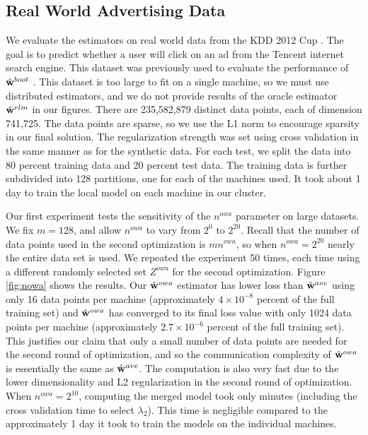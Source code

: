 \documentclass[thesis.tex]{subfiles}
\newcommand{\Zowa}{Z^{\textit{owa}}}
\newcommand{\nowa}{n^{\textit{owa}}}
\begin{document}
\vspace{-0.1in}
\subsection{Real World Advertising Data}

\vspace{-0.05in}
We evaluate the estimators on real world data from the KDD 2012 Cup \citep{kddcup2012}.
The goal is to predict whether a user will click on an ad from the Tencent internet search engine.
This dataset was previously used to evaluate the performance of $\hat{\mathbf w}^{boot}$ \citep{zhang2012communication}.
This dataset is too large to fit on a single machine,
so we must use distributed estimators,
and we do not provide results of the oracle estimator $\hat{\mathbf w}^{rlm}$ in our figures.
There are 235,582,879 distinct data points,
each of dimension 741,725.
The data points are sparse, so we use the L1 norm to encourage sparsity in our final solution.
The regularization strength was set using cross validation in the same manner as for the synthetic data.
For each test, we split the data into 80 percent training data and 20 percent test data.
The training data is further subdivided into 128 partitions,
one for each of the machines used.
It took about 1 day to train the local model on each machine in our cluster.

Our first experiment tests the sensitivity of the $\nowa$ parameter on large datasets.
We fix $m=128$, and allow $\nowa$ to vary from $2^0$ to $2^{20}$.
Recall that the number of data points used in the second optimization is $m\nowa$,
so when $\nowa=2^{20}$ nearly the entire data set is used.
We repeated the experiment 50 times, each time using a different randomly selected set $\Zowa$ for the second optimization.
Figure \ref{fig:nowa} shows the results.
Our $\hat{\mathbf w}^{owa}$ estimator has lower loss than $\hat{\mathbf w}^{ave}$ using only 16 data points per machine (approximately $4\times10^{-8}$ percent of the full training set)
and $\hat{\mathbf w}^{owa}$ has converged to its final loss value with only 1024 data points per machine (approximately $2.7\times10^{-6}$ percent of the full training set).
This justifies our claim that only a small number of data points are needed for the second round of optimization,
and so the communication complexity of $\hat{\mathbf w}^{owa}$ is essentially the same as $\hat{\mathbf w}^{ave}$.
The computation is also very fast due to the lower dimensionality and L2 regularization in the second round of optimization.
When $\nowa=2^{10}$, computing the merged model took only minutes 
(including the cross validation time to select $\lambda_2$).
This time is negligible compared to the approximately 1 day it took to train the models on the individual machines. 
\end{document}

